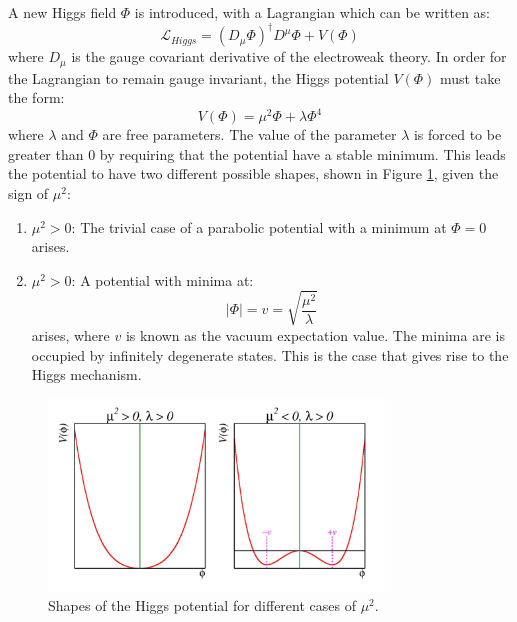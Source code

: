 A new Higgs field $\Phi$ is introduced, with a Lagrangian which can be written as:
\begin{equation}
\mathcal{L}_{Higgs} = (D_{\mu}\Phi)^{\dagger}D^{\mu}\Phi + V(\Phi)
\end{equation}
where $D_{\mu}$ is the gauge covariant derivative of the electroweak theory. In order for the Lagrangian to remain gauge invariant, the Higgs potential $V(\Phi)$ must take the form:
\begin{equation}
    V(\Phi) = {\mu}^2{\Phi} + {\lambda}{\Phi}^4
\end{equation}
where $\lambda$ and $\Phi$ are free parameters. The value of the parameter $\lambda$ is forced to be greater than 0 by requiring that the potential have a stable minimum. This leads the potential to have two different possible shapes, shown in Figure \ref{fig:higgspot}, given the sign of $\mu^2$:

\begin{enumerate}
    \item ${\mu^2 > 0}$: The trivial case of a parabolic potential with a minimum at $\Phi = 0$ arises.
    \item ${\mu^2 > 0}$: A potential with minima at:
    \begin{equation}
     |\Phi| = v = \sqrt{\frac{\mu^2}{\lambda}}
    \end{equation}
     arises, where $v$ is known as the vacuum expectation value. The minima are is occupied by infinitely degenerate states. This is the case that gives rise to the Higgs mechanism.
\end{enumerate}

\begin{figure}[h]
    \centering
    \includegraphics[width=0.8\textwidth]{Figures/1/HiggsPotential.png}
    \caption{Shapes of the Higgs potential for different cases of $\mu^2$.}
    \label{fig:higgspot}
\end{figure}

